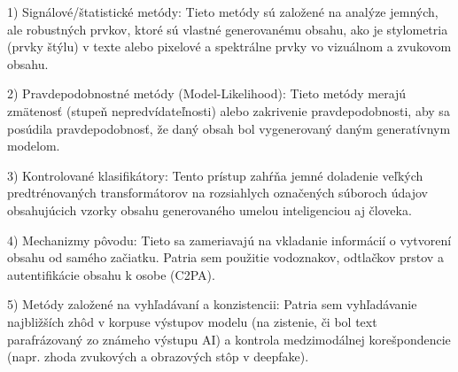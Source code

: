 \documentclass[]{tukediphc}
\begin{document}
1) Signálové/štatistické metódy: Tieto metódy sú založené na analýze jemných, ale robustných prvkov, ktoré sú vlastné generovanému obsahu, ako je stylometria (prvky štýlu) v texte alebo pixelové a spektrálne prvky vo vizuálnom a zvukovom obsahu.\cite{arxiv:2504.02898}

2) Pravdepodobnostné metódy (Model-Likelihood): Tieto metódy merajú zmätenosť (stupeň nepredvídateľnosti) alebo zakrivenie pravdepodobnosti, aby sa posúdila pravdepodobnosť, že daný obsah bol vygenerovaný daným generatívnym modelom. 

3) Kontrolované klasifikátory: Tento prístup zahŕňa jemné doladenie veľkých predtrénovaných transformátorov na rozsiahlych označených súboroch údajov obsahujúcich vzorky obsahu generovaného umelou inteligenciou aj človeka. 

4) Mechanizmy pôvodu: Tieto sa zameriavajú na vkladanie informácií o vytvorení obsahu od samého začiatku. Patria sem použitie vodoznakov, odtlačkov prstov a autentifikácie obsahu k osobe (C2PA). \cite{arxiv:2504.02898}

5) Metódy založené na vyhľadávaní a konzistencii: Patria sem vyhľadávanie najbližších zhôd v korpuse výstupov modelu (na zistenie, či bol text parafrázovaný zo známeho výstupu AI) a kontrola medzimodálnej korešpondencie (napr. zhoda zvukových a obrazových stôp v deepfake).\cite{arxiv:2504.02898}

\begin{table}[H]
\centering
\caption{Metódy na detekciu textu generovaného umelou inteligenciou (LLM)}
\label{tab:llm_detection_methods}
\end{table}
\end{document}
